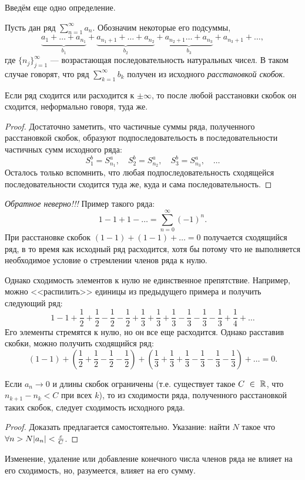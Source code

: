 \documentclass[a4paper, 12pt]{article}
\begin{document}
Введём еще одно определение.

\begin{Def}
	Пусть дан ряд $\sum\limits_{n=1}^{\infty}a_n$. Обозначим некоторые его подсуммы,
	$$
	\underbrace{a_1 + \ldots + a_{n_1}}_{b_1} + \underbrace{a_{n_1+1} + \ldots + a_{n_2}}_{b_2} + \underbrace{a_{n_2 + 1} \ldots + a_{n_3}}_{b_3} + a_{n_3 + 1} + \ldots,
	 $$
	 где $\{n_j\}_{j=1}^{\infty}$ --- возрастающая последовательность натуральных чисел. В таком случае говорят, что ряд $\sum\limits_{k =1}^{\infty} b_k$ получен из исходного \emph{расстановкой скобок}.
\end{Def}
\begin{Statement}
	Если ряд сходится или расходится к $\pm \infty$, то после любой расстановки скобок он сходится, неформально говоря, туда же.
\end{Statement}

\begin{proof}
	Достаточно заметить, что частичные суммы ряда, полученного расстановкой скобок, образуют подпоследовательость в последовательности частичных сумм исходного ряда:
	$$
	S^b_1 = S^a_{n_1}, \quad S^b_{2} = S^a_{n_2}, \quad S^b_3 = S^a_{n_3}, \quad \ldots
	$$
	Осталось только вспомнить, что любая подпоследовательность сходящейся последовательности сходится туда же, куда и сама последовательность.
\end{proof}
\emph{Обратное неверно!!!} Пример такого ряда:
$$
1 - 1 + 1 - \ldots = \sum\limits_{n = 0}^{\infty} \left(-1\right)^n.
$$
При расстановке скобок $(1 - 1) + (1 - 1) + \ldots = 0$ получается сходящийся ряд, в то время как исходный ряд расходится, хотя бы потому что не выполняется необходимое условие о стремлении членов ряда к нулю.

Однако сходимость элементов к нулю не единственное препятствие. Например, можно <<распилить>> единицы из предыдущего примера и получить следующий ряд:
$$
1 - 1 + \frac{1}{2} + \frac{1}{2} - \frac{1}{2} - \frac{1}{2} + \frac{1}{3} + \frac{1}{3} + \frac{1}{3} - \frac{1}{3} - \frac{1}{3} - \frac{1}{3} + \frac{1}{4} + \ldots
$$
Его элементы стремятся к нулю, но он все еще расходится. Однако расставив скобки, можно получить сходящийся ряд:
$$
(1 - 1) + \left(\frac{1}{2} + \frac{1}{2} - \frac{1}{2} - \frac{1}{2}\right) +\left( \frac{1}{3} + \frac{1}{3} + \frac{1}{3} - \frac{1}{3} - \frac{1}{3} - \frac{1}{3}\right) + \ldots = 0.
$$
\begin{Statement}
	Если $a_n \to 0$ и длины скобок ограничены (т.е. существует такое $C~\in~\mathbb{R}$, что $n_{k+1} - n_{k} < C$ при всех $k$), то из сходимости ряда, полученного расстановкой таких скобок, следует сходимость исходного ряда.
\end{Statement}
\begin{proof}
Доказать предлагается самостоятельно. Указание: найти $N$ такое что\\  $\forall n>N|a_n| < \frac{\varepsilon}{C}$.
\end{proof}
\begin{Statement}
	Изменение, удаление или добавление конечного числа членов ряда не влияет на его сходимость, но, разумеется, влияет на его сумму.
\end{Statement}
\end{document}
